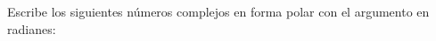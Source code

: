 \documentclass[addpoints,spanish, 12pt,a4paper]{exam}
\begin{document}
\begin{questions}
\begin{multicols}{1}
\begin{parts}
        \end{parts}
        \end{multicols}
        \question[1] Escribe los siguientes números complejos en forma polar con el argumento en radianes:
        \begin{multicols}{3} 
        \end{multicols}
        
    \end{questions}
    
\end{document}
